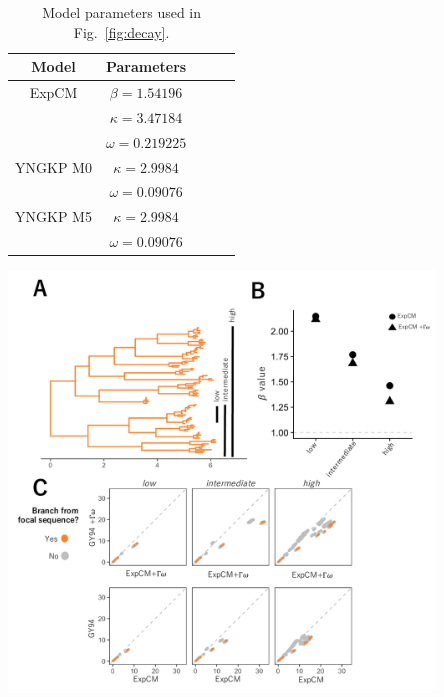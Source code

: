 \documentclass[11pt]{article}
\begin{document}
\begin{table}[t!]
\caption{\label{tab:wsn_low_params}
Model parameters used in  Fig.~\ref{fig:decay}.}
      \begin{tabular}{ccccc}
        \hline
          Model & Parameters\\ \hline
          ExpCM & $\beta=1.54196$\\
           & $\kappa=3.47184$\\
           & $\omega=0.219225$\\ 
          YNGKP M0 & $\kappa=2.9984$\\
          & $\omega=0.09076$\\
          YNGKP M5 & $\kappa=2.9984$\\
          & $\omega=0.09076$\\
      \end{tabular}
\end{table}

\begin{suppfig}[H]
\centerline{\includegraphics[width=0.85\textwidth]{figures/lee_compete}}
\caption{\label{fig:lee_compete}
\textbf{The ExpCM defined by H1 preferences lengthen longer branches on the HA tree.} 
\textbf{(A)} An HA alignment was subsampled to create three smaller alignments with varying degrees of divergence from the focal H3 sequence, referred to as "low", "intermediate", and "high". 
\textbf{(B)} The phylogenetic tree of the "high" alignment. 
The colors denote the alignment and the black circle denotes the focal H3 sequence. 
\textbf{(C)} The value of the ExpCM and ExpCM+$\Gamma\omega$ stringency parameter $\beta$ decreases as the divergence from the focal H3 sequence increases. 
\textbf{(D)} Comparisons of branch lengths optimized by the four substitution models for the varying degrees of divergence. 
Black points represent branches from the focal H3 sequence and grey points represent all other branches.  
The branch lengths are in average number of codon substitutions per site. 
}
\end{suppfig}


\clearpage 


\end{document}
